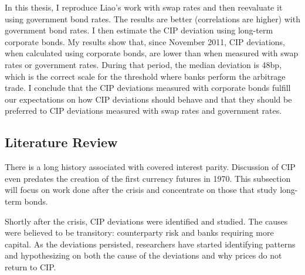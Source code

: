 In this thesis, I reproduce Liao's work with swap rates and then reevaluate it using government bond rates.  The results are better (correlations are higher) with government bond rates.  I then estimate the CIP deviation using long-term corporate bonds.  My results show that, since November 2011, CIP deviations, when calculated using corporate bonds, are lower than when measured with swap rates or government rates.  During that period, the median deviation is 48bp, which is the correct scale for the threshold where banks perform the arbitrage trade.  I conclude that the CIP deviations measured with corporate bonds fulfill our expectations on how CIP deviations should behave and that they should be preferred to CIP deviations measured with swap rates and government rates.






\subsection{Literature Review}


There is a long history associated with covered interest parity.  Discussion of CIP even predates the creation of the first currency futures in 1970.\cite{Kolb2010}  This subsection will focus on work done after the crisis and concentrate on those that study long-term bonds.  


Shortly after the crisis, CIP deviations were identified and studied.  The causes were believed to be transitory: counterparty risk and banks requiring more capital.\cite{Coffey2009}  As the deviations persisted, researchers have started identifying patterns and hypothesizing on both the cause of the deviations and why prices do not return to CIP. 

